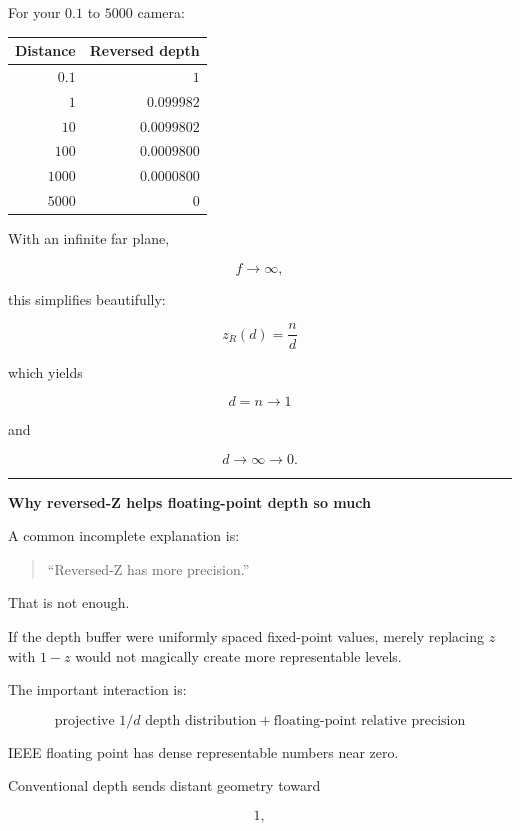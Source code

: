 For your \(0.1\) to \(5000\) camera:

{\def\LTcaptype{none} %
\begin{longtable}[]{@{}rr@{}}
\toprule\noalign{}
Distance & Reversed depth \\
\midrule\noalign{}
\endhead
\bottomrule\noalign{}
\endlastfoot
\(0.1\) & \(1\) \\
\(1\) & \(0.099982\) \\
\(10\) & \(0.0099802\) \\
\(100\) & \(0.0009800\) \\
\(1000\) & \(0.0000800\) \\
\(5000\) & \(0\) \\
\end{longtable}
}

With an infinite far plane,

\[
f\rightarrow\infty,
\]

this simplifies beautifully:

\[
\boxed{
z_R(d)=\frac nd
}
\]

which yields

\[
d=n\rightarrow1
\]

and

\[
d\rightarrow\infty\rightarrow0.
\]

\begin{center}\rule{0.5\linewidth}{0.5pt}\end{center}

\textbf{Why reversed-Z helps floating-point depth so much}

A common incomplete explanation is:

\begin{quote}
``Reversed-Z has more precision.''
\end{quote}

That is not enough.

If the depth buffer were uniformly spaced fixed-point values, merely replacing \(z\) with \(1-z\) would not magically create more representable levels.

The important interaction is:

\[
\boxed{
\text{projective }1/d\text{ depth distribution}
+
\text{floating-point relative precision}
}
\]

IEEE floating point has dense representable numbers near zero.

Conventional depth sends distant geometry toward

\[
1,
\]

